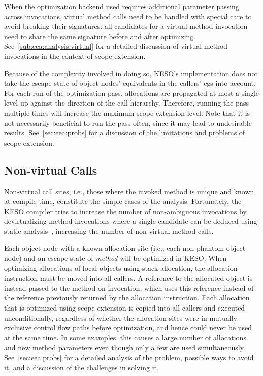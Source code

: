 		When the optimization backend used requires additional parameter passing across invocations, virtual method calls
		need to be handled with special care to avoid breaking their signatures: all candidates for a virtual method
		invocation need to share the same signature before and after optimizing. See~\cref{sub:eea:analysis:virtual} for
		a detailed discussion of virtual method invocations in the context of scope extension.

		Because of the complexity involved in doing so, KESO's implementation does not take the escape state of object
		nodes' equivalents in the callers' \glspl{cg} into account. For each run of the optimization pass, allocations are
		propagated at most a single level up against the direction of the call hierarchy. Therefore, running the pass
		multiple times will increase the maximum scope extension level. Note that it is not necessarily beneficial to run
		the pass often, since it may lead to undesirable results. See~\cref{sec:eea:probs} for a discussion of the
		limitations and problems of scope extension.

		\subsection{Non-virtual Calls}
			\label{sub:eea:analysis:nonvirtual}
			Non-virtual call sites, i.e., those where the invoked method is unique and known at compile time, constitute the
			simple cases of the analysis. Fortunately, the KESO compiler tries to increase the number of non-ambiguous
			invocations by devirtualizing method invocations where a single candidate can be deduced using static
			analysis~\cite[Sec.~3.4]{erhardt:11:jtres}, increasing the number of non-virtual method calls.

			Each object node with a known allocation site (i.e., each non-phantom object node) and an escape state of
			\emph{method} will be optimized in KESO\@. When optimizing allocations of local objects using stack allocation,
			the allocation instruction must be moved into all callers. A reference to the allocated object is instead passed
			to the method on invocation, which uses this reference instead of the reference previously returned by the
			allocation instruction. Each allocation that is optimized using scope extension is copied into all callers and
			executed unconditionally, regardless of whether the allocation sites were in mutually exclusive control flow paths
			before optimization, and hence could never be used at the same time. In some examples, this causes a large number
			of allocations and new method parameters even though only a few are used simultaneously. See~\cref{sec:eea:probs}
			for a detailed analysis of the problem, possible ways to avoid it, and a discussion of the challenges in solving
			it.

